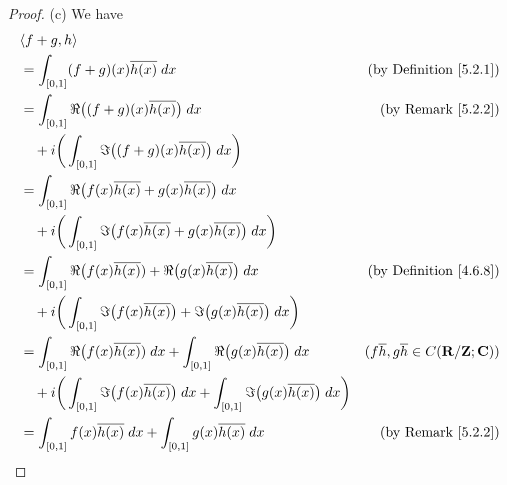 \begin{proof}{(c)}
    We have
    \begin{align*}
         & \inner*{f + g, h}                                                                                                                                                                          \\
         & = \int_{[0, 1]} (f + g)(x) \overline{h(x)} \; dx                                                                                    & \text{(by Definition \ref{5.2.1})}                   \\
         & = \int_{[0, 1]} \Re\big((f + g)(x) \overline{h(x)}\big) \; dx                                                                       & \text{(by Remark \ref{5.2.2})}                       \\
         & \quad + i \bigg(\int_{[0, 1]} \Im\big((f + g)(x) \overline{h(x)}\big) \; dx\bigg)                                                                                                          \\
         & = \int_{[0, 1]} \Re\big(f(x) \overline{h(x)} + g(x) \overline{h(x)}\big) \; dx                                                                                                             \\
         & \quad + i \bigg(\int_{[0, 1]} \Im\big(f(x) \overline{h(x)} + g(x) \overline{h(x)}\big) \; dx\bigg)                                                                                         \\
         & = \int_{[0, 1]} \Re\big(f(x) \overline{h(x)}) + \Re\big(g(x) \overline{h(x)}\big) \; dx                                             & \text{(by Definition \ref{4.6.8})}                   \\
         & \quad + i \bigg(\int_{[0, 1]} \Im\big(f(x) \overline{h(x)}\big) + \Im\big(g(x) \overline{h(x)}\big) \; dx\bigg)                                                                            \\
         & = \int_{[0, 1]} \Re\big(f(x) \overline{h(x)}) \; dx + \int_{[0, 1]} \Re\big(g(x) \overline{h(x)}\big) \; dx                         & (f \overline{h}, g \overline{h} \in C(\R / \Z ; \C)) \\
         & \quad + i \bigg(\int_{[0, 1]} \Im\big(f(x) \overline{h(x)}\big) \; dx + \int_{[0, 1]} \Im\big(g(x) \overline{h(x)}\big) \; dx\bigg)                                                        \\
         & = \int_{[0, 1]} f(x) \overline{h(x)} \; dx + \int_{[0, 1]} g(x) \overline{h(x)} \; dx                                               & \text{(by Remark \ref{5.2.2})}                       \\

\end{align*}
\end{proof}
